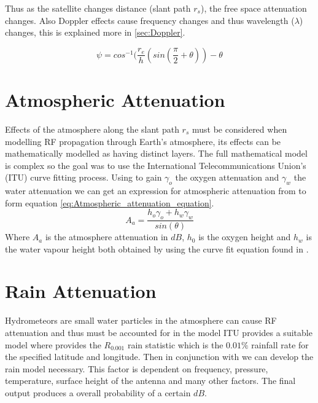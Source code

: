 \documentclass[conference]{IEEEtran}
\begin{document}
Thus as the satellite changes distance (slant path $r_s$), the free space attenuation changes. Also Doppler effects cause frequency changes and thus wavelength ($\lambda$) changes, this is explained more in \ref{sec:Doppler}.  

\begin{equation}
\psi = cos^{-1}(\frac{r_e}{h}(sin(\frac{\pi}{2}+\theta))-\theta
\label{eq:Central_angle_equation}
\end{equation}

\label{sec:Free_space}

\section{Atmospheric Attenuation}
Effects of the atmosphere along the slant path $r_s$ must be considered when modelling RF propagation through Earth's atmosphere, its effects can be mathematically modelled as having distinct layers. The full mathematical model is complex so the goal was to use the International Telecommunications Union's (ITU) curve fitting process. Using \cite{ITU-R_P.676-5} to gain $\gamma_{o}$ the oxygen attenuation and $\gamma_w$ the water attenuation we can get an expression for atmospheric attenuation from \cite{ITU-R_P.618-7} to form equation \ref{eq:Atmospheric_attenuation_equation}.
\begin{equation}
A_a = \frac{h_o \gamma_o + h_w \gamma_w}{sin(\theta)}
\label{eq:Atmospheric_attenuation_equation}
\end{equation}
Where $A_a$ is the atmosphere attenuation in $dB$, $h_0$ is the oxygen height and $h_w$ is the water vapour height both obtained by using the curve fit equation found in \cite{ITU-R_P.618-7}.

\label{sec:Atmosphere}

\section{Rain Attenuation}
Hydrometeors are small water particles in the atmosphere can cause RF attenuation and thus must be accounted for in the model ITU provides a suitable model where \cite{ITU-R_P.837-1} provides the $R_{0.001}$ rain statistic which is the $0.01\%$ rainfall rate for the specified latitude and longitude. Then in conjunction with \cite{ITU-R_P.618-7} we can develop the rain model necessary. This factor is dependent on frequency, pressure, temperature, surface height of the antenna and many other factors. The final output produces a overall probability of a certain $dB$.\\
\end{document}
